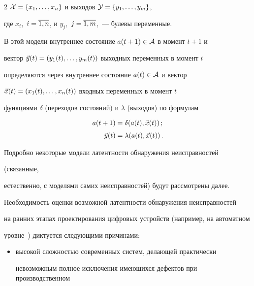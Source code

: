 \begin{multicols}{2}
${\cal X} = \{x_1,\ldots,x_n\}$ и выходов ${\cal Y} = \{y_1,\ldots,y_m\}$,


где $x_i$,\ $i=\overline{1,n}$, и $y_j$,\ $j=\overline{1,m}$,~--- булевы переменные.


В этой модели внутреннее состояние $a(t+1)\in \cal A$ в момент $t+1$ и


вектор $\vec y(t) = (y_1(t),\ldots,y_m(t))$ выходных переменных в момент $t$


определяются через внутреннее состояние $a(t)\in \cal A$ и вектор


$\vec x(t) = (x_1(t),\ldots,x_n(t))$ входных переменных в момент $t$


функциями $\delta$ (переходов состояний) и $\lambda$ (выходов) по формулам





\noindent


\begin{align}


a(t+1) &=\delta(a(t),\v x(t))\,;\notag\\[-6pt]


&\label{1}\\[-6pt]


\v y(t) &=


\lambda(a(t),\v x(t))\,.\notag


\end{align}





 Подробно некоторые модели латентности обнаружения неисправностей


(связанные,


ес\-тес\-т\-вен\-но, с моделями самих неисправностей) будут рас\-смот\-ре\-ны далее.








 Необходимость оценки возможной ла\-тент\-ности обнаружения неисправностей


на ранних этапах проектирования цифровых устройств (например, на автоматном


уровне~\cite{2}) диктуется следующими причинами:


\begin{itemize}


 \item высокой сложностью современных систем, делающей практически


невозможным полное исключения имеющихся дефектов при производственном



\end{itemize}
\end{multicols}
